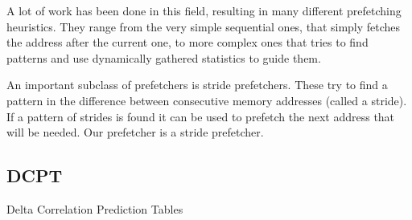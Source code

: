 A lot of work has been done in this field, resulting in many different
prefetching heuristics. They range from the very simple sequential ones, that
simply fetches the address after the current one, to more complex ones that
tries to find patterns and use dynamically gathered statistics to guide them\cite{prefetch_range}.

An important subclass of prefetchers is stride prefetchers. These try to find a
pattern in the difference between consecutive memory addresses (called a
stride). If a pattern of strides is found it can be used to prefetch the next
address that will be needed. Our prefetcher is a stride prefetcher.

\subsection{}


\subsection{DCPT}
Delta Correlation Prediction Tables
\cite{dcpt}
